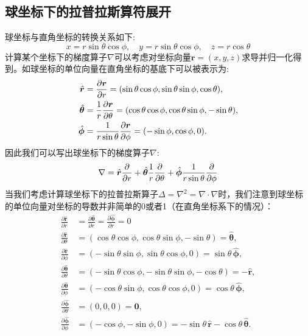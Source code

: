 \subsection{球坐标下的拉普拉斯算符展开}
球坐标与直角坐标的转换关系如下:
\[x=r\sin\theta\cos\phi, \quad y=r\sin\theta\cos\phi, \quad z=r\cos\theta\]
计算某个坐标下的梯度算子$\nabla$可以考虑对坐标向量$\bm{r}=(x,y,z)$求导并归一化得到。如球坐标的单位向量在直角坐标的基底下可以被表示为:
\begin{equation*}
\begin{aligned}
\hat{\bm{r}} &=\pdv{\bm{r}}{r}= (\sin\theta \cos\phi, \sin\theta \sin\phi, \cos\theta), \\
\hat{\bm{\theta}} &=\frac{1}{r}\pdv{\bm{r}}{\theta}= (\cos\theta \cos\phi, \cos\theta \sin\phi, -\sin\theta), \\
\hat{\bm{\phi}} &=\frac{1}{r\sin\theta}\pdv{\bm{r}}{\phi}= (-\sin\phi, \cos\phi, 0).
\end{aligned}
\end{equation*}
因此我们可以写出球坐标下的梯度算子$\nabla$:
\[\nabla=\hat{\bm{r}}\pdv{r}+\hat{\bm{\theta}}\frac{1}{r}\pdv{\theta}+\hat{\bm{\phi}}\frac{1}{r\sin\theta}\pdv{\phi}\]
当我们考虑计算球坐标下的拉普拉斯算子$\Delta=\nabla^2=\nabla\cdot\nabla$时，我们注意到球坐标的单位向量对坐标的导数并非简单的0或者1（在直角坐标系下的情况）：
\begin{equation*}
\begin{aligned}
\frac{\partial \hat{\bm{r}}}{\partial r} &=\frac{\partial \hat{\bm{\theta}}}{\partial r}=\frac{\partial \hat{\bm{\phi}}}{\partial r}=0\\
\frac{\partial \hat{\bm{r}}}{\partial \theta} &= (\cos\theta \cos\phi, \cos\theta \sin\phi, -\sin\theta) = \hat{\bm{\theta}}, \\
\frac{\partial \hat{\bm{r}}}{\partial \phi} &= (-\sin\theta \sin\phi, \sin\theta \cos\phi, 0) = \sin\theta \, \hat{\bm{\phi}},\\
\frac{\partial \hat{\bm{\theta}}}{\partial \theta} &= (-\sin\theta \cos\phi, -\sin\theta \sin\phi, -\cos\theta) = -\hat{\bm{r}}, \\
\frac{\partial \hat{\bm{\theta}}}{\partial \phi} &= (-\cos\theta \sin\phi, \cos\theta \cos\phi, 0) = \cos\theta \, \hat{\bm{\phi}},\\
\frac{\partial \hat{\bm{\phi}}}{\partial \theta} &= (0, 0, 0) = \bm{0}, \\
\frac{\partial \hat{\bm{\phi}}}{\partial \phi} &= (-\cos\phi, -\sin\phi, 0) = -\sin\theta \, \hat{\bm{r}} - \cos\theta \, \hat{\bm{\theta}}.
\end{aligned}
\end{equation*}

